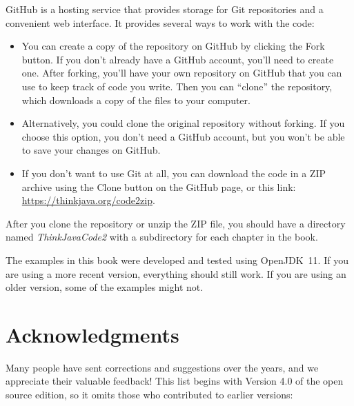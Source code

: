 
GitHub is a hosting service that provides storage for Git repositories and a convenient web interface.
It provides several ways to work with the code:

\begin{itemize}

\item You can create a copy of the repository on GitHub by clicking the {\sf Fork} button.
If you don't already have a GitHub account, you'll need to create one.
After forking, you'll have your own repository on GitHub that you can use to keep track of code you write.
Then you can ``clone'' the repository, which downloads a copy of the files to your computer.

\item Alternatively, you could clone the original repository without forking.
If you choose this option, you don't need a GitHub account, but you won't be able to save your changes on GitHub.

\item If you don't want to use Git at all, you can download the code in a ZIP archive using the {\sf Clone} button on the GitHub page, or this link: \url{https://thinkjava.org/code2zip}.

\end{itemize}

After you clone the repository or unzip the ZIP file, you should have a directory named {\it ThinkJavaCode2} with a subdirectory for each chapter in the book.

The examples in this book were developed and tested using OpenJDK~11.
If you are using a more recent version, everything should still work.
If you are using an older version, some of the examples might not.


\section*{Acknowledgments}

Many people have sent corrections and suggestions over the years, and we appreciate their valuable feedback!
This list begins with Version 4.0 of the open source edition, so it omits those who contributed to earlier versions:

